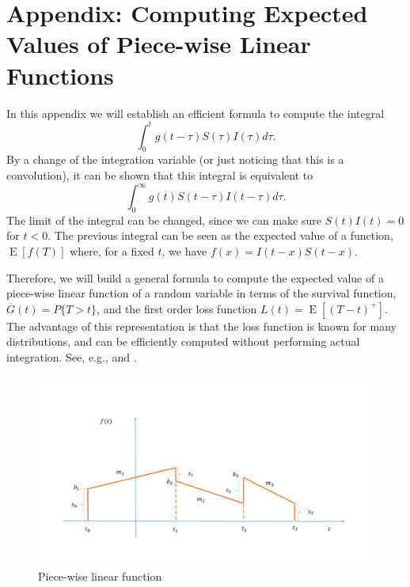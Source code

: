 \documentclass[USenglish,10pt]{article}
\newcommand{\eg}{e.g.\xspace}
\newcommand{\Gb}{\overline{G}\xspace}
\DeclareMathOperator{\Exp}{E}       %
\newcommand{\E}[1]{\Exp\left[{#1}\right]}       %
\begin{document}
\appendix

\section{Appendix: Computing Expected Values of Piece-wise Linear Functions} \label{app:piecewise}

In this appendix we will establish an efficient formula to compute the integral
\[ \int_0^{t} g(t-\tau) S(\tau)I(\tau)d\tau.  \]
By a change of the integration variable (or just noticing that this is a convolution), it can be shown that this integral is equivalent to
\[  \int_0^{\infty} g(t) S(t-\tau)I(t-\tau)d\tau.  \]
The limit of the integral can be changed, since we can make sure $S(t)I(t)=0$ for $t<0$. The previous integral can be seen as the expected value of a function, $\E{f(T)}$ where, for a fixed $t$, we have $f(x)=I(t-x)S(t-x)$.

Therefore, we will build a general formula to compute the expected value of a piece-wise linear function of a random variable in terms  of the survival function, $\Gb(t) = P\{T >t\}$, and the first order loss function $L(t)=\E{(T-t)^+}$.
The advantage of this representation is that the loss function is known for many distributions, and can be efficiently computed without performing actual integration. See, \eg, \cite[Page 14]{burn.ea.10} and \cite[Appendix C]{zipk00}.

\begin{figure}[ht]
    \centering
    \includegraphics[width=.6\textwidth]{figures/piecewise}
    \caption{Piece-wise linear function}
    \label{fg:piecewise}
\end{figure}
\end{document}
